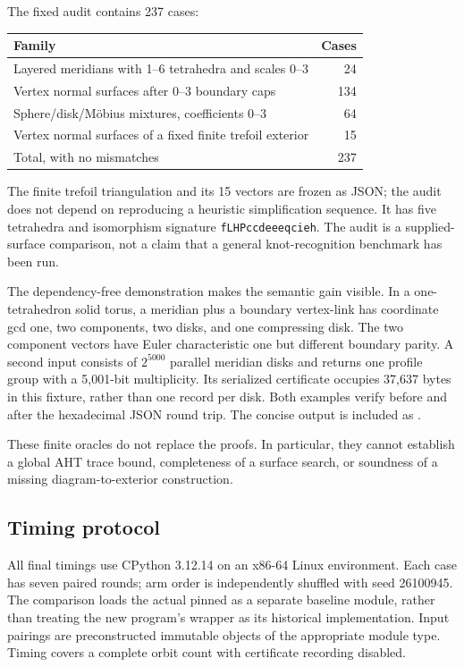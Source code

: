 The fixed audit contains 237 cases:
\begin{center}
\begin{tabular}{lr}
\toprule
Family & Cases \\
\midrule
Layered meridians with 1--6 tetrahedra and scales 0--3 & 24 \\
Vertex normal surfaces after 0--3 boundary caps & 134 \\
Sphere/disk/M\"obius mixtures, coefficients 0--3 & 64 \\
Vertex normal surfaces of a fixed finite trefoil exterior & 15 \\
\midrule
Total, with no mismatches & 237 \\
\bottomrule
\end{tabular}
\end{center}
The finite trefoil triangulation and its 15 vectors are frozen as JSON; the
audit does not depend on reproducing a heuristic simplification sequence.
It has five tetrahedra and isomorphism signature
\texttt{fLHPccdeeeqcieh}.  The audit is a supplied-surface comparison, not a
claim that a general knot-recognition benchmark has been run.

The dependency-free demonstration makes the semantic gain visible.  In a
one-tetrahedron solid torus, a meridian plus a boundary vertex-link has
coordinate gcd one, two components, two disks, and one compressing disk.
The two component vectors have Euler characteristic one but different
boundary parity.  A second input consists of $2^{5000}$ parallel meridian
disks and returns one profile group with a 5,001-bit multiplicity.
Its serialized certificate occupies 37,637 bytes in this fixture, rather
than one record per disk.  Both examples verify before and after the
hexadecimal JSON round trip.  The concise output is included as
.

These finite oracles do not replace the proofs.  In particular, they cannot
establish a global AHT trace bound, completeness of a surface search, or
soundness of a missing diagram-to-exterior construction.

\subsection{Timing protocol}

All final timings use CPython 3.12.14 on an x86-64 Linux environment.  Each
case has seven paired rounds; arm order is independently shuffled with seed
26100945.  The comparison loads the actual pinned
 as a separate baseline module, rather than treating
the new program's  wrapper as its historical implementation.
Input pairings are preconstructed immutable objects of the appropriate
module type.  Timing covers a complete orbit count with certificate
recording disabled.

